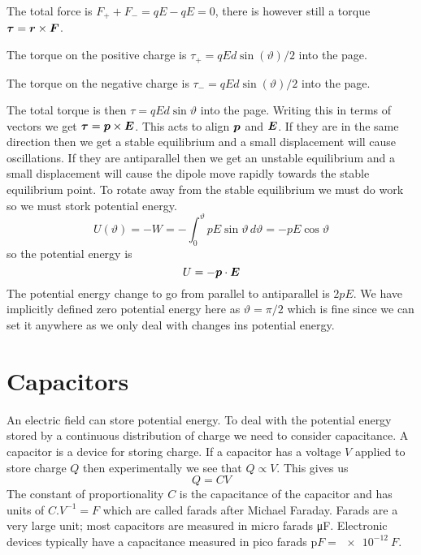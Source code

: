 \documentclass{article}
\begin{document}
    The total force is \(F_+ + F_- = qE - qE = 0\), there is however still a torque \(\bm{\tau} = \bm{r}\times\bm{F}\).
    
    The torque on the positive charge is \(\tau_+ = qEd\sin(\vartheta)/2\) into the page.
    
    The torque on the negative charge is \(\tau_- = qEd\sin(\vartheta)/2\) into the page.
    
    The total torque is then \(\tau = qEd\sin\vartheta\) into the page.
    Writing this in terms of vectors we get \(\bm{\tau} = \bm{p}\times\bm{E}\).
    This acts to align \(\bm{p}\) and \(\bm{E}\).
    If they are in the same direction then we get a stable equilibrium and a small displacement will cause oscillations.
    If they are antiparallel then we get an unstable equilibrium and a small displacement will cause the dipole move rapidly towards the stable equilibrium point.
    To rotate away from the stable equilibrium we must do work so we must stork potential energy.
    \[U(\vartheta) = -W = -\int_0^\vartheta pE\sin\vartheta\,d\vartheta = -pE\cos\vartheta\]
    so the potential energy is
    \[U = -\bm{p}\cdot\bm{E}\]
    The potential energy change to go from parallel to antiparallel is \(2pE\).
    We have implicitly defined zero potential energy here as \(\vartheta = \pi/2\) which is fine since we can set it anywhere as we only deal with changes ins potential energy.
    
    \section{Capacitors}
    An electric field can store potential energy.
    To deal with the potential energy stored by a continuous distribution of charge we need to consider capacitance.
    A capacitor is a device for storing charge.
    If a capacitor has a voltage \(V\) applied to store charge \(Q\) then experimentally we see that \(Q\propto V\).
    This gives us
    \[Q = CV\]
    The constant of proportionality \(C\) is the capacitance of the capacitor and has units of \(\si{C.V^{-1}} = \si{F}\) which are called farads after Michael Faraday.
    Farads are a very large unit; most capacitors are measured in micro farads \si{\micro F}.
    Electronic devices typically have a capacitance measured in pico farads \(\si{\pico F} = \SI{e-12}{F}\).
    
\end{document}
